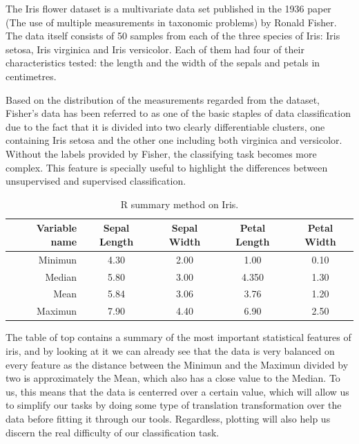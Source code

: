 The Iris flower dataset is a multivariate data set published in the 1936 paper (The use of multiple measurements in taxonomic problems) by Ronald Fisher. The data itself consists of 50 samples from each of the three species of Iris: Iris setosa, Iris virginica and Iris versicolor. Each of them had four of their characteristics tested: the length and the width of the sepals and petals in centimetres. \par

Based on the distribution of the measurements regarded from the dataset, Fisher's data has been referred to as one of the basic staples of data classification due to the fact that it is divided into two clearly differentiable clusters, one containing Iris setosa and the other one including both virginica and versicolor. Without the labels provided by Fisher, the classifying task becomes more complex. This feature is specially useful to highlight the differences between unsupervised and supervised classification.\newline

\begin{table}[H]
		\caption{R summary method on Iris.}
	\begin{center}
	\label{tab:table_Iris}
		\begin{tabular}{r|c|c|c|c} %
			\textbf{Variable name} & \textbf{Sepal Length} & \textbf{Sepal Width} & \textbf{Petal Length} & \textbf{Petal Width}\\
			\hline
			Minimun & 4.30 & 2.00 & 1.00 & 0.10\\
			Median & 5.80 & 3.00 & 4.350 & 1.30\\
			Mean & 5.84 & 3.06 & 3.76 & 1.20\\
			Maximun & 7.90 & 4.40 & 6.90 & 2.50\\
		\end{tabular}
	\end{center}
\end{table}

The table of top contains a summary of the most important statistical features of iris, and by looking at it we can already see that the data is very balanced on every feature as the distance between the Minimun and the Maximun divided by two is approximately the Mean, which also has a close value to the Median. To us, this means that the data is centerred over a certain value, which will allow us to simplify our tasks by doing some type of translation transformation over the data before fitting it through our tools. Regardless, plotting will also help us discern the real difficulty of our classification task.

